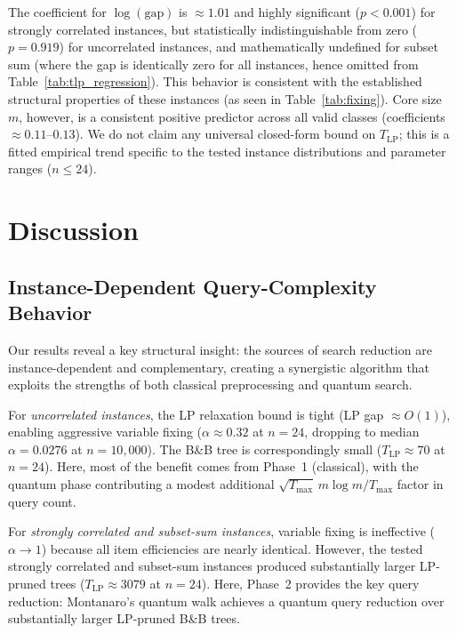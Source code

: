 \documentclass[conference]{IEEEtran}
\begin{document}
The coefficient for $\log(\text{gap})$ is $\approx 1.01$ and highly significant ($p < 0.001$) for strongly correlated instances, but statistically indistinguishable from zero ($p = 0.919$) for uncorrelated instances, and mathematically undefined for subset sum (where the gap is identically zero for all instances, hence omitted from Table~\ref{tab:tlp_regression}). This behavior is consistent with the established structural properties of these instances (as seen in Table~\ref{tab:fixing}). Core size $m$, however, is a consistent positive predictor across all valid classes (coefficients $\approx 0.11\text{--}0.13$). We do not claim any universal closed-form bound on $T_{\text{LP}}$; this is a fitted empirical trend specific to the tested instance distributions and parameter ranges ($n \le 24$).

\section{Discussion}

\subsection{Instance-Dependent Query-Complexity Behavior}

Our results reveal a key structural insight: the sources of search reduction are instance-dependent and complementary, creating a synergistic algorithm that exploits the strengths of both classical preprocessing and quantum search.

For \textit{uncorrelated instances}, the LP relaxation bound is tight (LP gap $\approx O(1)$), enabling aggressive variable fixing ($\alpha \approx 0.32$ at $n = 24$, dropping to median $\alpha = 0.0276$ at $n = 10{,}000$). The B\&B tree is correspondingly small ($T_{\text{LP}} \approx 70$ at $n=24$). Here, most of the benefit comes from Phase~1 (classical), with the quantum phase contributing a modest additional $\sqrt{T_{\max}}\,m\log m / T_{\max}$ factor in query count.

For \textit{strongly correlated and subset-sum instances}, variable fixing is ineffective ($\alpha \to 1$) because all item efficiencies are nearly identical. However, the tested strongly correlated and subset-sum instances produced substantially larger LP-pruned trees ($T_{\text{LP}} \approx 3079$ at $n=24$). Here, Phase~2 provides the key query reduction: Montanaro's quantum walk achieves a quantum query reduction over substantially larger LP-pruned B\&B trees.
\end{document}
